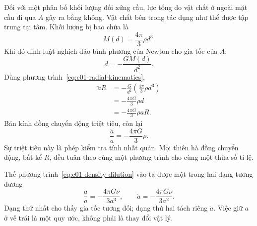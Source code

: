 Đối với một phân bố khối lượng đối xứng cầu, lực tổng do vật chất ở ngoài mặt cầu đi qua \(A\) gây ra bằng không. Vật chất bên trong tác dụng như thể được tập trung tại tâm. Khối lượng bị bao chứa là
\begin{equation}
M(d)=\frac{4\pi}{3}\rho d^3.
\label{eq:c01-enclosed-mass}
\end{equation}
Khi đó định luật nghịch đảo bình phương của Newton cho gia tốc của \(A\):
\begin{equation}
\ddot d=-\frac{GM(d)}{d^2}.
\end{equation}
Dùng phương trình~\eqref{eq:c01-radial-kinematics},
\begin{align}
\ddot a R
&=-\frac{G}{d^2}\left(\frac{4\pi}{3}\rho d^3\right) \\
&=-\frac{4\pi G}{3}\rho d \\
&=-\frac{4\pi G}{3}\rho aR.
\end{align}
Bán kính đồng chuyển động triệt tiêu, còn lại
\begin{equation}
\boxed{\frac{\ddot a}{a}=-\frac{4\pi G}{3}\rho.}
\label{eq:c01-acceleration}
\end{equation}
Sự triệt tiêu này là phép kiểm tra tính nhất quán. Mọi thiên hà đồng chuyển động, bất kể \(R\), đều tuân theo cùng một phương trình cho cùng một thừa số tỉ lệ.

Thế phương trình~\eqref{eq:c01-density-dilution} vào ta được một trong hai dạng tương đương
\begin{equation}
\frac{\ddot a}{a}=-\frac{4\pi G\nu}{3a^3},
\qquad
\ddot a=-\frac{4\pi G\nu}{3a^2}.
\label{eq:c01-acceleration-nu}
\end{equation}
Dạng thứ nhất cho thấy gia tốc tương đối; dạng thứ hai tách riêng \(\ddot a\). Việc giữ \(a\) ở vế trái là một quy ước, không phải là thay đổi vật lý.

\begin{classroomqa}
\end{classroomqa}

